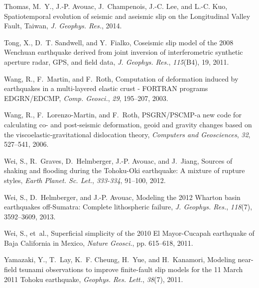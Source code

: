 \documentclass[10pt]{article}
\begin{document}
\begin{thebibliography}{38}
Thomas, M.~Y., J.-P. Avouac, J.~Champenois, J.-C. Lee, and L.-C. Kuo,
  {Spatiotemporal evolution of seismic and aseismic slip on the Longitudinal
  Valley Fault, Taiwan}, \textit{J. Geophys. Res.}, 2014.

Tong, X., D.~T. Sandwell, and Y.~Fialko, {Coseismic slip model of the 2008
  Wenchuan earthquake derived from joint inversion of interferometric synthetic
  aperture radar, GPS, and field data}, \textit{J. Geophys. Res.},
  \textit{115}(B4), 19, 2011.

Wang, R., F.~Martin, and F.~Roth, {Computation of deformation induced by
  earthquakes in a multi-layered elastic crust - FORTRAN programs EDGRN/EDCMP},
  \textit{Comp. Geosci.}, \textit{29}, 195--207, 2003.

Wang, R., F.~Lorenzo-Martin, and F.~Roth, {PSGRN/PSCMP}-a new code for
  calculating co- and post-seismic deformation, geoid and gravity changes based
  on the viscoelastic-gravitational dislocation theory, \textit{Computers and
  Geosciences}, \textit{32}, 527--541, 2006.

Wei, S., R.~Graves, D.~Helmberger, J.-P. Avouac, and J.~Jiang, {Sources of
  shaking and flooding during the Tohoku-Oki earthquake: A mixture of rupture
  styles}, \textit{Earth Planet. Sc. Let.}, \textit{333-334}, 91--100, 2012.

Wei, S., D.~Helmberger, and J.-P. Avouac, {Modeling the 2012 Wharton basin
  earthquakes off-Sumatra: Complete lithospheric failure}, \textit{J. Geophys.
  Res.}, \textit{118}(7), 3592--3609, 2013.

Wei, S., et~al., {Superficial simplicity of the 2010 El Mayor-Cucapah
  earthquake of Baja California in Mexico}, \textit{Nature Geosci.}, pp.
  615--618, 2011.

Yamazaki, Y., T.~Lay, K.~F. Cheung, H.~Yue, and H.~Kanamori, {Modeling
  near-field tsunami observations to improve finite-fault slip models for the
  11 March 2011 Tohoku earthquake}, \textit{Geophys. Res. Lett.},
  \textit{38}(7), 2011.

\end{thebibliography}
\end{document}
